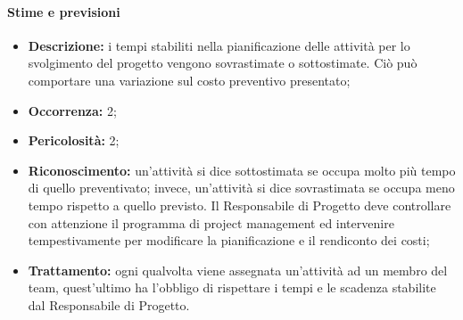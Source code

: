 \paragraph{Stime e previsioni}
\begin{itemize}
	\item \textbf{Descrizione:} i tempi stabiliti nella pianificazione delle attività per lo svolgimento del progetto vengono sovrastimate o sottostimate. Ciò può comportare una variazione sul costo preventivo presentato;
	\item \textbf{Occorrenza:} 2;
	\item \textbf{Pericolosità:} 2;
	\item \textbf{Riconoscimento:} un’attività si dice sottostimata se occupa molto più tempo di quello preventivato; invece, un'attività si dice sovrastimata se occupa meno tempo rispetto a quello previsto. Il Responsabile di Progetto deve controllare con attenzione il
	programma di project management ed intervenire tempestivamente per modificare la pianificazione e il rendiconto dei costi;
	\item \textbf{Trattamento:} ogni qualvolta viene assegnata un'attività ad un membro del team, quest'ultimo ha l'obbligo di rispettare i tempi e le scadenza stabilite dal Responsabile di Progetto.
\end{itemize}